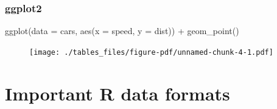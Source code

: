 \documentclass[
  letterpaper,
  DIV=11,
  numbers=noendperiod]{scrreprt}
\newenvironment{Shaded}{\begin{snugshade}}{\end{snugshade}}
\newcommand{\AttributeTok}[1]{\textcolor[rgb]{0.40,0.45,0.13}{#1}}
\newcommand{\FunctionTok}[1]{\textcolor[rgb]{0.28,0.35,0.67}{#1}}
\newcommand{\NormalTok}[1]{\textcolor[rgb]{0.00,0.23,0.31}{#1}}
\newcommand{\SpecialCharTok}[1]{\textcolor[rgb]{0.37,0.37,0.37}{#1}}
\begin{document}
\hypertarget{ggplot2}{%
\subsubsection{ggplot2}\label{ggplot2}}

\begin{Shaded}
\begin{Highlighting}[]
\FunctionTok{ggplot}\NormalTok{(}\AttributeTok{data =}\NormalTok{ cars, }\FunctionTok{aes}\NormalTok{(}\AttributeTok{x =}\NormalTok{ speed, }\AttributeTok{y =}\NormalTok{ dist)) }\SpecialCharTok{+} \FunctionTok{geom\_point}\NormalTok{()}
\end{Highlighting}
\end{Shaded}

\begin{figure}[H]

{\centering \texttt{[image: ./tables\_files/figure-pdf/unnamed-chunk-4-1.pdf]}

}

\end{figure}

\hypertarget{important-r-data-formats}{%
\section{Important R data formats}\label{important-r-data-formats}}
\end{document}
